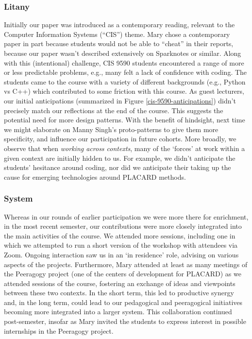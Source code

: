 \documentclass[acmlarge,timestamp]{acmart}
\begin{document}
\subsubsection{Litany}
Initially our paper was introduced as a contemporary reading, relevant
to the Computer Information Systems (“CIS”) theme.  Mary chose a
contemporary paper in part because students would not be able to
“cheat” in their reports, because our paper wasn’t described
extensively on Sparknotes or similar.  Along with this (intentional)
challenge, CIS 9590 students encountered a range of more or less
predictable problems, e.g., many felt a lack of confidence with
coding.  The students came to the course with a variety of different
backgrounds (e.g., Python vs C++) which contributed to some friction
with this course.  As guest lecturers, our initial anticipations
(summarized in Figure \ref{cis-9590-anticipations}) didn’t precisely
match our reflections at the end of the course.  This suggests the
potential need for more design patterns.  With the benefit of
hindsight, next time we might elaborate on Manny Singh’s
proto-patterns to give them more specificity, and influence our
participation in future cohorts.  More broadly, we observe that when
\emph{working across contexts}, many of the ‘forces’ at work within a
given context are initially hidden to us.  For example, we didn’t
anticipate the students’ hesitance around coding, nor did we anticipate
their taking up the cause for emerging technologies around PLACARD
methods.

\subsubsection{System}
Whereas in our rounds of earlier participation we were more there for
enrichment, in the most recent semester, our contributions were more
closely integrated into the main activities of the course.  We
attended more sessions, including one in which we attempted to run a
short version of the workshop with attendees via Zoom.  Ongoing
interaction saw us in an ‘in residence’ role, advising on various
aspects of the projects.  Furthermore, Mary attended at least as many
meetings of the Peeragogy project (one of the centers of development
for PLACARD) as we attended sessions of the course, fostering an
exchange of ideas and viewpoints between these two contexts. In the
short term, this led to productive synergy and, in the long term,
could lead to our pedagogical and peeragogical initiatives becoming
more integrated into a larger system. This collaboration continued
post-semester, insofar as Mary invited the students to express
interest in possible internships in the Peeragogy project.
\end{document}

